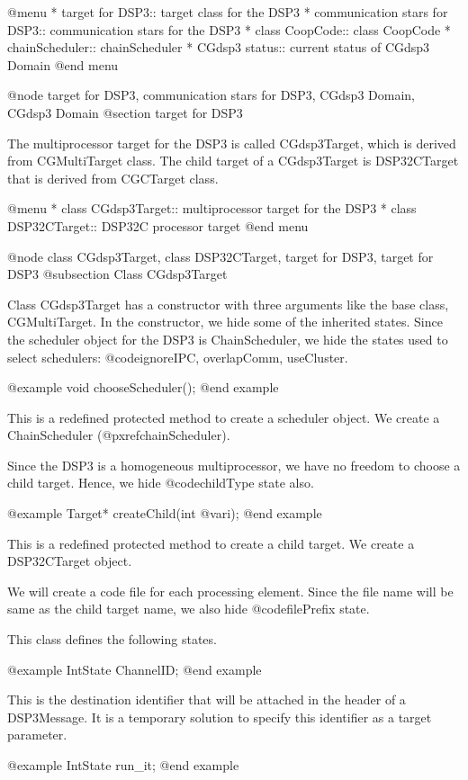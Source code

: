 {@menu
* target for DSP3::			target class for the DSP3
* communication stars for DSP3::	communication stars for the DSP3
* class CoopCode::			class CoopCode
* chainScheduler::			chainScheduler
* CGdsp3 status::			current status of CGdsp3 Domain
@end menu

@node target for DSP3, communication stars for DSP3, CGdsp3 Domain, CGdsp3 Domain
@section target for DSP3

The multiprocessor target for the DSP3 is called CGdsp3Target, which is
derived from CGMultiTarget class. The child target of a CGdsp3Target is
DSP32CTarget that is derived from CGCTarget class. 

@menu
* class CGdsp3Target::		multiprocessor target for the DSP3
* class DSP32CTarget::		DSP32C processor target
@end menu

@node class CGdsp3Target, class DSP32CTarget, target for DSP3, target for DSP3
@subsection Class CGdsp3Target

Class CGdsp3Target has a constructor with three arguments like the base class,
CGMultiTarget. In the constructor, we hide some of the inherited states.
Since the scheduler object for the DSP3 is ChainScheduler, we hide the states
used to select schedulers: @code{ignoreIPC, overlapComm, useCluster}.

@example
void chooseScheduler();
@end example

This is a redefined protected method to create a scheduler object. We create
a ChainScheduler (@pxref{chainScheduler}).

Since the DSP3 is a homogeneous multiprocessor, we have no freedom to choose
a child target. Hence, we hide @code{childType} state also.

@example
Target* createChild(int @var{i});
@end example

This is a redefined protected method to create a child target. We create a
DSP32CTarget object.

We will create a code file for each processing element. Since the file name
will be same as the child target name, we also hide @code{filePrefix} state.

This class defines the following states.

@example
IntState ChannelID;
@end example

This is the destination identifier that will be attached in the header of
a DSP3Message. It is a temporary solution to specify this identifier as
a target parameter.

@example
IntState run_it;
@end example

}
